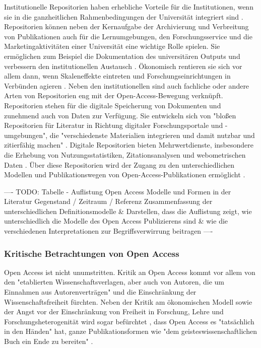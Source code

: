 Institutionelle Repositorien haben erhebliche Vorteile für die Institutionen, wenn sie in die ganzheitlichen Rahmenbedingungen der Universität integriert sind \cite{steele_2006}. Repositorien können neben der Kernaufgabe der Archivierung und Verbreitung von Publikationen auch für die Lernumgebungen, den Forschungsservice und die Marketingaktivitäten einer Universität eine wichtige Rolle spielen. Sie ermöglichen zum Beispiel die Dokumentation des universitären Outputs und verbessern den institutionellen Austausch \cite{steele_2006}. Ökonomisch rentieren sie sich vor allem dann, wenn Skaleneffekte eintreten und Forschungseinrichtungen in Verbünden agieren \cite{blythe_2005value}. Neben den institutionellen sind auch fachliche oder andere Arten von Repositorien eng mit der Open-Access-Bewegung verknüpft. Repositorien stehen für die digitale Speicherung von Dokumenten und zunehmend auch von Daten zur Verfügung. Sie entwickeln sich von "bloßen Repositorien für Literatur in Richtung digitaler Forschungsportale und -umgebungen", die "verschiedenste Materialien integrieren und damit nutzbar und zitierfähig machen" \cite{Schmidt_2009}. Digitale Repositorien bieten Mehrwertdienste, insbesondere die Erhebung von Nutzungsstatistiken, Zitationsanalysen und webometrischen Daten \cite{jahn_2011_personliche} \cite{mayr_2005_webometrie}. Über diese Repositorien wird der Zugang zu den unterschiedlichen Modellen und Publikationswegen von Open-Access-Publikationen ermöglicht \cite{suber_2015}.

---- TODO: Tabelle - Auflistung Open Access  Modelle und Formen in der Literatur Gegenstand / Zeitraum / Referenz Zusammenfassung der unterschiedlichen Definitionsmodelle & Darstellen, dass die Auflistung zeigt, wie unterschiedlich die Modelle des Open Access Publizierens sind & wie die verschiedenen Interpretationen zur Begriffsverwirrung beitragen ----

\subsubsection{Kritische Betrachtungen von Open Access}

Open Access ist nicht unumstritten. Kritik an Open Access kommt vor allem von den "etablierten Wissenschaftsverlagen, aber auch von Autoren, die um Einnahmen aus Autorenverträgen" \cite{Schirmbacher_oa_2007} und die Einschränkung der Wissenschaftsfreiheit fürchten. Neben der Kritik am ökonomischen Modell sowie der Angst vor der Einschränkung von Freiheit in Forschung, Lehre und Forschungsheterogenität wird sogar befürchtet \cite{Szczesny_2014}, dass Open Access es "tatsächlich in den Händen" hat, ganze Publikationsformen wie "dem geisteswissenschaftlichen Buch ein Ende zu bereiten" \cite{Hirschi_2015_buch_oa}.

